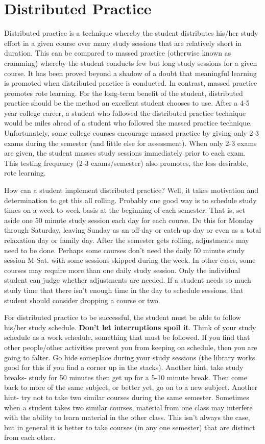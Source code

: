 \chapter{Distributed Practice}

Distributed practice is a technique whereby the student distributes his/her study effort in a given course over many study sessions that are relatively short in duration. This can be compared to massed practice (otherwise known as cramming) whereby the student conducts few but long study sessions for a given course. It has been proved beyond a shadow of a doubt that meaningful learning is promoted when distributed practice is conducted. In contrast, massed practice promotes rote learning. For the long-term benefit of the student, distributed practice should be the method an excellent student chooses to use. After a 4-5 year college career, a student who followed the distributed practice technique would be miles ahead of a student who followed the massed practice technique. Unfortunately, some college courses encourage massed practice by giving only 2-3 exams during the semester (and little else for assessment). When only 2-3 exams are given, the student masses study sessions immediately prior to each exam. This testing frequency (2-3 exams/semester) also promotes, the less desirable, rote learning.

How can a student implement distributed practice? Well, it takes motivation and determination to get this all rolling. Probably one good way is to schedule study times on a week to week basis at the beginning of each semester. That is, set aside one 50 minute study session each day for each course. Do this for Monday through Saturday, leaving Sunday as an off-day or catch-up day or even as a total relaxation day or family day. After the semester gets rolling, adjustments may need to be done. Perhaps some courses don't need the daily 50 minute study session M-Sat. with some sessions skipped during the week. In other cases, some courses may require more than one daily study session. Only the individual student can judge whether adjustments are needed. If a student needs so much study time that there isn't enough time in the day to schedule sessions, that student should consider dropping a course or two.

For distributed practice to be successful, the student must be able to follow his/her study schedule. \textbf{Don't let interruptions spoil it}. Think of your study schedule as a work schedule, something that must be followed. If you find that other people/other activities prevent you from keeping on schedule, then you are going to falter. Go hide someplace during your study sessions (the library works good for this if you find a corner up in the stacks). Another hint, take study breaks- study for 50 minutes then get up for a 5-10 minute break. Then come back to more of the same subject, or better yet, go on to a new subject. Another hint- try not to take two similar courses during the same semester. Sometimes when a student takes two similar courses, material from one class may interfere with the ability to learn material in the other class. This isn't always the case, but in general it is better to take courses (in any one semester) that are distinct from each other.